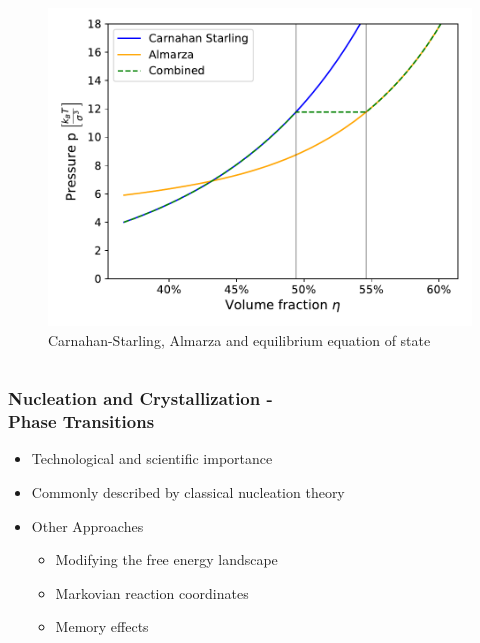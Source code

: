 \documentclass[smaller,notes=hide]{beamer}
\newlength{\wideitemsep}
\let\olditem\item
\renewcommand{\item}{\setlength{\itemsep}{\wideitemsep}\olditem}
\begin{document}
\begin{frame}
\begin{columns}
\begin{figure}[h]
\centering
\includegraphics[width=1 \linewidth]{Hard_sphere_phase_diagram.pdf}
\caption[]{Carnahan-Starling\cite{Carnahan1969}, Almarza\cite{Almarza2009} and equilibrium equation of state}
\label{fig:hs_phase_diagram}
\end{figure}
\end{columns}
\end{frame}



\iffalse

\begin{frame}
\frametitle{Nucleation and Crystallization - \\ \hfill Phase Transitions}
\begin{itemize}
\item Technological and scientific importance
\item Commonly described by classical nucleation theory\\
\vspace{0.5cm}
\item<1> Other Approaches
\begin{itemize}
\item Modifying the free energy landscape
\item Markovian reaction coordinates
\item Memory effects
\end{itemize}
\end{itemize}
\end{frame}
\end{document}
